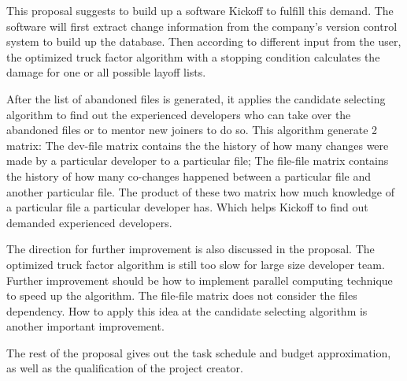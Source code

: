 \documentclass[12pt, a4paper, openright]{report}
\begin{document}
This proposal suggests to build up a software Kickoff to fulfill this demand. The software will first extract change information from the company's version control system to build up the database. Then according to different input from the user, the optimized truck factor algorithm with a stopping condition calculates the damage for one or all possible layoff lists. 

After the list of abandoned files is generated, it applies the candidate selecting algorithm to find out the experienced developers who can take over the abandoned files or to mentor new joiners to do so. This algorithm generate 2 matrix: The dev-file matrix contains the the history of how many changes were made by a particular developer to a particular file; The file-file matrix contains the history of how many co-changes happened between a particular file and another particular file. The product of these two matrix how much knowledge of a particular file a particular developer has. Which helps Kickoff to find out demanded experienced developers.

The direction for further improvement is also discussed in the proposal. The optimized truck factor algorithm is still too slow for large size developer team. Further improvement should be how to implement parallel computing technique to speed up the algorithm. The file-file matrix does not consider the files dependency. How to apply this idea at the candidate selecting algorithm is another important improvement.

The rest of the proposal gives out the task schedule and budget approximation, as well as the qualification of the project creator.



\mainmatter



\chapter*{}
\end{document}
